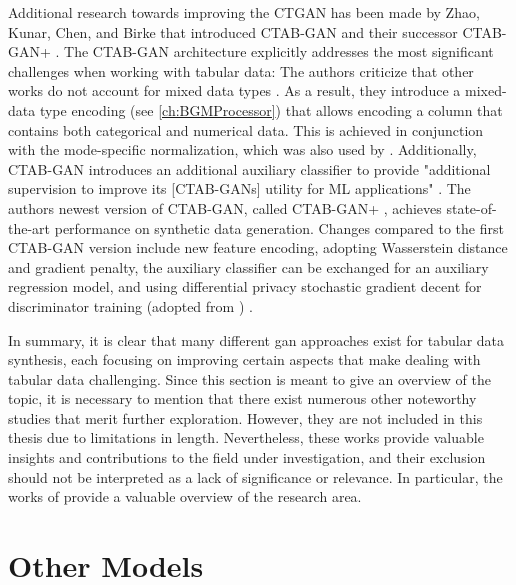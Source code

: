Additional research towards improving the CTGAN has been made by Zhao, Kunar, Chen, and Birke that introduced CTAB-GAN \cite{zhao2021CTABGANEffectiveTablea} and their successor CTAB-GAN+ \cite{zhao2022CTABGANEnhancingTabular}.
The CTAB-GAN architecture explicitly addresses the most significant challenges when working with tabular data:
The authors criticize that other works do not account for mixed data types \cite{zhao2022CTABGANEnhancingTabular}.
As a result, they introduce a mixed-data type encoding (see \autoref{ch:BGMProcessor}) that allows encoding a column that contains both categorical and numerical data.
This is achieved in conjunction with the mode-specific normalization, which was also used by \textcite{xu2018SynthesizingTabularData, xu2019ModelingTabularData}.
Additionally, CTAB-GAN introduces an additional auxiliary classifier to provide "additional supervision to improve its [CTAB-GANs] utility for ML applications" \cite[p. 2]{zhao2021CTABGANEffectiveTablea}.
The authors newest version of CTAB-GAN, called CTAB-GAN+ \cite{zhao2022CTABGANEnhancingTabular}, achieves state-of-the-art performance on synthetic data generation.
Changes compared to the first CTAB-GAN version include new feature encoding, adopting Wasserstein distance and gradient penalty, the auxiliary classifier can be exchanged for an auxiliary regression model,
and using differential privacy stochastic gradient decent \cite{abadi2016DeepLearningDifferential} for discriminator training (adopted from \cite{jordon2018PATEGANGeneratingSynthetic}) \cite{zhao2022CTABGANEnhancingTabular}.

In summary, it is clear that many different \gls{gan} approaches exist for tabular data synthesis, each focusing on improving certain aspects that make dealing with tabular data challenging.
Since this section is meant to give an overview of the topic, 
it is necessary to mention that there exist numerous other noteworthy studies that merit further exploration. 
However, they are not included in this thesis due to limitations in length. 
Nevertheless, these works provide valuable insights and contributions to the field under investigation, and their exclusion should not be interpreted as a lack of significance or relevance. 
In particular, the works of \textcite{fan2020RelationalDataSynthesisa, hernandez2022SyntheticDataGeneration, bourou2021ReviewTabularData} provide a valuable overview of the research area.


\section{Other Models}
\label{ch:relatedWork-Other Models}

